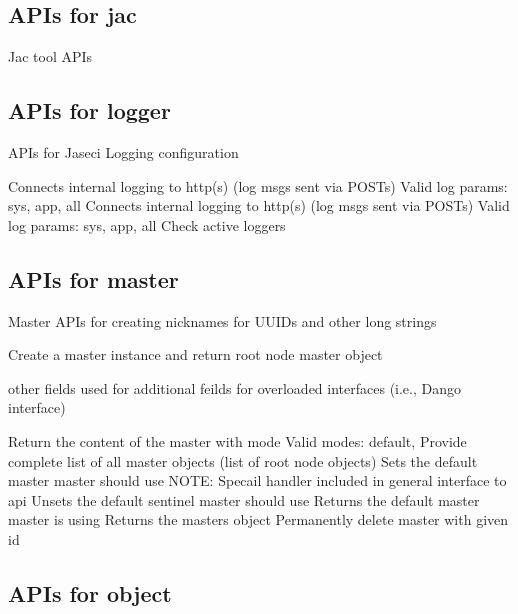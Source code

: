 \subsection{APIs for jac}

Jac tool APIs

\subsection{APIs for logger}

APIs for Jaseci Logging configuration

{Connects internal logging to http(s) (log msgs sent via POSTs)
Valid log params: {sys, app, all }}
{Connects internal logging to http(s) (log msgs sent via POSTs)
Valid log params: {sys, app, all }}
{Check active loggers}
\subsection{APIs for master}

Master APIs for creating nicknames for UUIDs and other long strings

{Create a master instance and return root node master object

other fields used for additional feilds for overloaded interfaces
(i.e., Dango interface)}
{Return the content of the master with mode
Valid modes: {default, }}
{Provide complete list of all master objects (list of root node objects)}
{Sets the default master master should use
NOTE: Specail handler included in general interface to api}
{Unsets the default sentinel master should use}
{Returns the default master master is using}
{Returns the masters object}
{Permanently delete master with given id}
\subsection{APIs for object}

